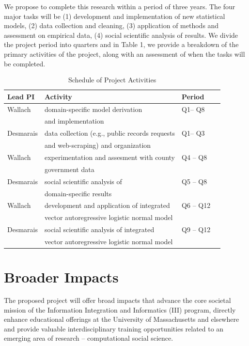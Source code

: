 We propose to complete this research within a period of three years. The four major tasks will be (1) development and implementation of new statistical models, (2) data collection and cleaning, (3) application of methods and assessment on empirical data, (4) social scientific analysis of results. We divide the project period into quarters and in Table 1, we provide a breakdown of the primary activities of the project, along with an assessment of when the tasks will be completed.


\begin{table}[h]
\caption{Schedule of Project Activities}
\begin{center}
\begin{tabular}{|l|l|l|l|}
\hline
{\bf Lead PI} & {\bf Activity} & {\bf Period} \\ \hline
Wallach & domain-specific model derivation   &   Q1-- Q8 \\ 
& and implementation &  \\ \hline
Desmarais & data collection (e.g., public records requests  & Q1-- Q3 \\
&  and web-scraping)  and organization & \\ \hline
Wallach & experimentation and assesment with county & Q4 -- Q8 \\
&  government data & \\ \hline
Desmarais & social scientific analysis  of & Q5 -- Q8 \\
& domain-specific results & \\ \hline
Wallach & development and application of integrated & Q6 -- Q12 \\
& vector autoregressive logistic normal model & \\ \hline
Desmarais & social scientific analysis of integrated & Q9 -- Q12 \\
& vector autoregressive logistic normal model & \\ \hline

\end{tabular}
\end{center}
\label{schedule}
\end{table}%



\section{Broader Impacts}

The proposed project will offer broad impacts that advance the core societal mission of the Information Integration and Informatics (III) program, directly enhance educational offerings at the University of Massachusetts and elsewhere and provide valuable interdisciplinary training opportunities related to an emerging area of research -- computational social science.


